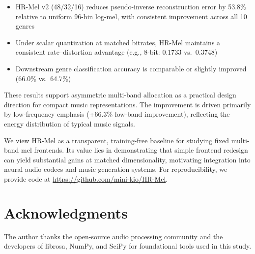 \documentclass[twocolumn]{article}
\begin{document}
\begin{itemize}
\item HR-Mel v2 (48/32/16) reduces pseudo-inverse reconstruction error by 53.8\% relative to uniform 96-bin log-mel, with consistent improvement across all 10 genres
\item Under scalar quantization at matched bitrates, HR-Mel maintains a consistent rate--distortion advantage (e.g., 8-bit: 0.1733 vs.\ 0.3748)
\item Downstream genre classification accuracy is comparable or slightly improved (66.0\% vs.\ 64.7\%)
\end{itemize}

These results support asymmetric multi-band allocation as a practical design direction for compact music representations. The improvement is driven primarily by low-frequency emphasis (+66.3\% low-band improvement), reflecting the energy distribution of typical music signals.

We view HR-Mel as a transparent, training-free baseline for studying fixed multi-band mel frontends. Its value lies in demonstrating that simple frontend redesign can yield substantial gains at matched dimensionality, motivating integration into neural audio codecs and music generation systems. For reproducibility, we provide code at \url{https://github.com/mini-kio/HR-Mel}.

\section*{Acknowledgments}

The author thanks the open-source audio processing community and the developers of librosa, NumPy, and SciPy for foundational tools used in this study.
\end{document}
